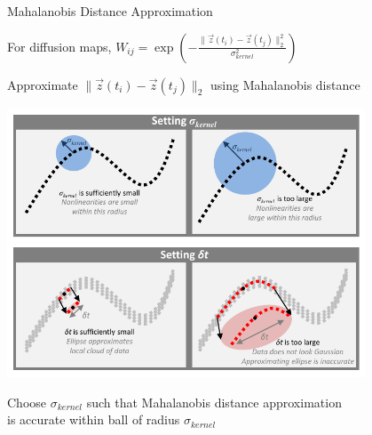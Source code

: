 \documentclass[12pt]{beamer}
\begin{document}
\begin{frame}{Mahalanobis Distance Approximation}

\centering

 
For diffusion maps,
$W_{ij} = \exp \left( -\frac{\| \vec{z}(t_i) - \vec{z}(t_j) \|_2^2}{\sigma_{kernel}^2} \right) $

Approximate $\| \vec{z}(t_i) - \vec{z}(t_j) \|_2$ using Mahalanobis distance

\vspace{0.5cm}

\includegraphics[width=0.8\textwidth, trim=0cm 5cm 0cm 0cm, clip]{schematic}

Choose $\sigma_{kernel}$ such that Mahalanobis distance approximation \\ is accurate
within ball of radius $\sigma_{kernel}$

\end{frame}
\end{document}
